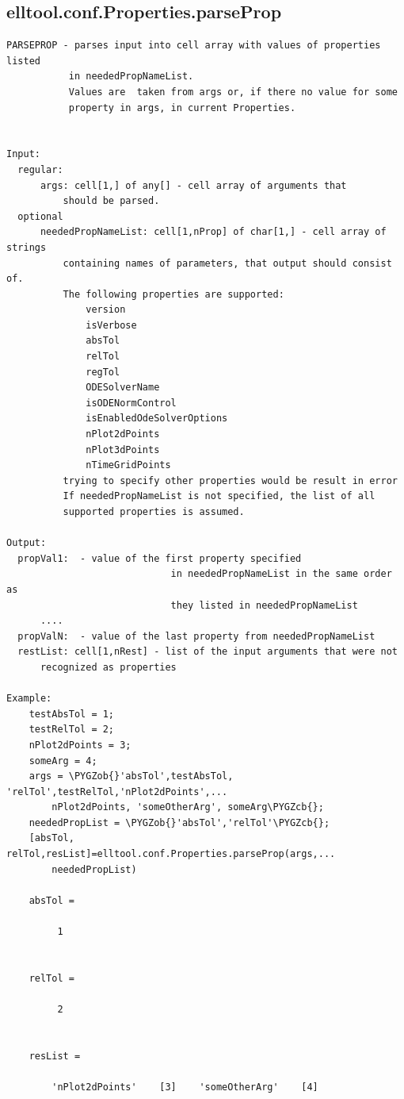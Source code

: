 \documentclass[letterpaper,10pt,english]{sphinxmanual}
\def\PYGZob{\char`\{}
\def\PYGZcb{\char`\}}
\begin{document}
\subsection{elltool.conf.Properties.parseProp}
\label{chap_functions:elltool-conf-properties-parseprop}
\begin{Verbatim}[commandchars=\\\{\}]
PARSEPROP - parses input into cell array with values of properties listed
           in neededPropNameList.
           Values are  taken from args or, if there no value for some
           property in args, in current Properties.


Input:
  regular:
      args: cell[1,] of any[] - cell array of arguments that
          should be parsed.
  optional
      neededPropNameList: cell[1,nProp] of char[1,] - cell array of strings
          containing names of parameters, that output should consist of.
          The following properties are supported:
              version
              isVerbose
              absTol
              relTol
              regTol
              ODESolverName
              isODENormControl
              isEnabledOdeSolverOptions
              nPlot2dPoints
              nPlot3dPoints
              nTimeGridPoints
          trying to specify other properties would be result in error
          If neededPropNameList is not specified, the list of all
          supported properties is assumed.

Output:
  propVal1:  - value of the first property specified
                             in neededPropNameList in the same order as
                             they listed in neededPropNameList
      ....
  propValN:  - value of the last property from neededPropNameList
  restList: cell[1,nRest] - list of the input arguments that were not
      recognized as properties

Example:
    testAbsTol = 1;
    testRelTol = 2;
    nPlot2dPoints = 3;
    someArg = 4;
    args = \PYGZob{}'absTol',testAbsTol, 'relTol',testRelTol,'nPlot2dPoints',...
        nPlot2dPoints, 'someOtherArg', someArg\PYGZcb{};
    neededPropList = \PYGZob{}'absTol','relTol'\PYGZcb{};
    [absTol, relTol,resList]=elltool.conf.Properties.parseProp(args,...
        neededPropList)

    absTol =

         1


    relTol =

         2


    resList =

        'nPlot2dPoints'    [3]    'someOtherArg'    [4]
\end{Verbatim}
\end{document}
